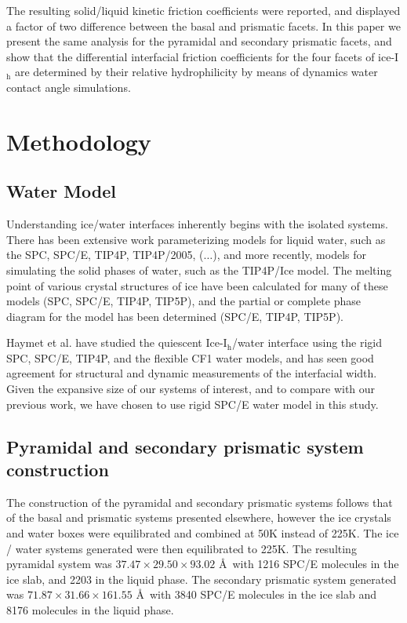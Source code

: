 \documentclass{pnastwo}
\begin{document}
\begin{article}
The resulting solid/liquid kinetic friction coefficients were
reported, and displayed a factor of two difference between the
basal and prismatic facets.
In this paper we present the same analysis for the pyramidal and secondary 
prismatic facets, and show that the differential interfacial friction 
coefficients for the four facets of ice-I$_\mathrm{h}$ are determined by their 
relative hydrophilicity by means of dynamics water contact angle simulations. 

\section{Methodology}

\subsection{Water Model}
Understanding ice/water interfaces inherently begins with the isolated
systems. There has been extensive work parameterizing models for liquid water,
such as the SPC\cite{Berendsen81}, SPC/E\cite{Berendsen87}, 
TIP4P\cite{Jorgensen85}, TIP4P/2005\cite{Abascal05}, 
($\dots$), and more recently, models for simulating
the solid phases of water, such as the TIP4P/Ice\cite{Abascal05b} model. The 
melting point of various crystal structures of ice have been calculated for 
many of these models
(SPC\cite{Karim90,Abascal07}, SPC/E\cite{Baez95,Arbuckle02,Gay02,Bryk02,Bryk04b,Sanz04b,Gernandez06,Abascal07,Vrbka07}, TIP4P\cite{Karim88,Gao00,Sanz04,Sanz04b,Koyama04,Wang05,Fernandez06,Abascal07}, TIP5P\cite{Sanz04,Koyama04,Wang05,Fernandez06,Abascal07}), 
and the partial or complete phase diagram for the model has been determined
(SPC/E\cite{Baez95,Bryk04b,Sanz04b}, TIP4P\cite{Sanz04,Sanz04b,Koyama04}, TIP5P\cite{Sanz04,Koyama04}). 

Haymet et al. have studied the quiescent Ice-I$_\mathrm{h}$/water interface
using the rigid SPC, SPC/E, TIP4P, and the flexible CF1 water models, and has seen good
agreement for structural and dynamic measurements of the interfacial
width. Given the expansive size of our systems of interest, and to
compare with our previous work, we have chosen to use rigid SPC/E
water model in this study.

\subsection{Pyramidal and secondary prismatic system construction}

The construction of the pyramidal and secondary prismatic systems follows that
of 
the basal and prismatic systems presented elsewhere\cite{Louden13}, however
the ice crystals and water boxes were equilibrated and combined at 50K 
instead of 225K. The ice / water systems generated were then equilibrated 
to 225K. The resulting pyramidal system was 
$37.47 \times 29.50 \times 93.02$ \AA\ with 1216
SPC/E\cite{Berendsen87} molecules in the ice slab, and 2203 in the liquid 
phase. The secondary 
prismatic system generated was $71.87 \times 31.66 \times 161.55$ \AA\ with 
3840 
SPC/E molecules in the ice slab and 8176 molecules in the liquid phase.


\end{article}
\end{document}
